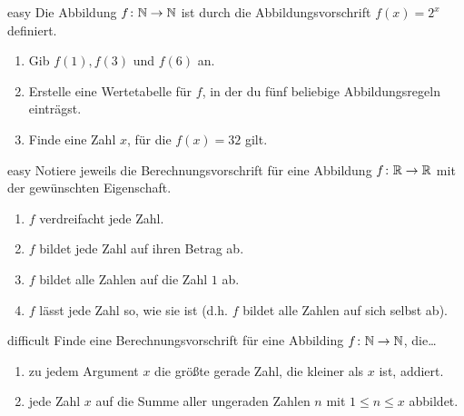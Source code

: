 \documentclass[../funktionen.tex]{subfiles}
\begin{document}
\begin{exercise}{easy}
    Die Abbildung $f\colon\mathbb{N}\rightarrow\mathbb{N}$ ist durch die Abbildungsvorschrift $f(x)=2^x$ definiert.
    \begin{enumerate}
        \item Gib $f(1), f(3)$ und $f(6)$ an.
        \item Erstelle eine Wertetabelle für $f$, in der du fünf beliebige Abbildungsregeln einträgst.
        \item Finde eine Zahl $x$, für die $f(x)=32$ gilt.
    \end{enumerate}
\end{exercise}
\begin{exercise}{easy}
    Notiere jeweils die Berechnungsvorschrift für eine Abbildung $f\colon\mathbb{R}\rightarrow\mathbb{R}$ mit der gewünschten Eigenschaft.
    \begin{enumerate}
        \item $f$ verdreifacht jede Zahl.
        \item $f$ bildet jede Zahl auf ihren Betrag ab.
        \item $f$ bildet alle Zahlen auf die Zahl $1$ ab.
        \item $f$ lässt jede Zahl so, wie sie ist (d.h. $f$ bildet alle Zahlen auf sich selbst ab).
    \end{enumerate}
\end{exercise}
\begin{exercise}{difficult}
    Finde eine Berechnungsvorschrift für eine Abbilding $f\colon\mathbb{N}\rightarrow\mathbb{N}$, die\dots
    \begin{enumerate}
        \item zu jedem Argument $x$ die größte gerade Zahl, die kleiner als $x$ ist, addiert.
        \item jede Zahl $x$ auf die Summe aller ungeraden Zahlen $n$ mit $1\leq n\leq x$ abbildet.
    \end{enumerate}
\end{exercise}
\end{document}
